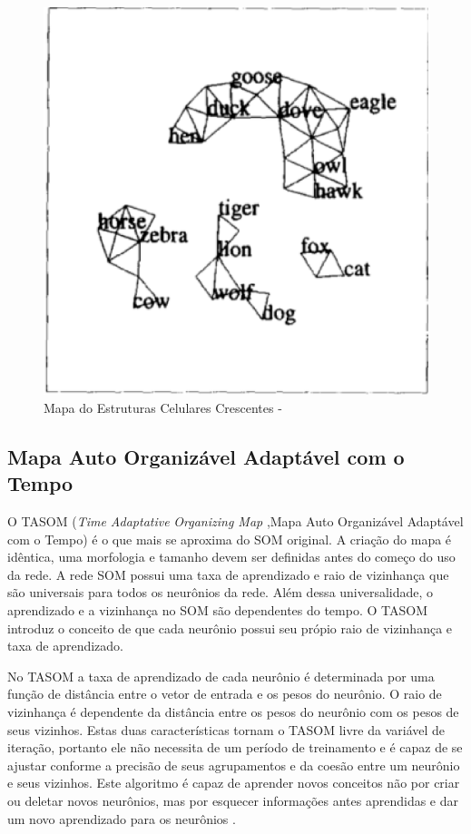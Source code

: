 \begin{figure}[!h]
\centering
\includegraphics[keepaspectratio=true,scale=0.50]
{figuras/cellsom.eps}
\caption{Mapa do Estruturas Celulares Crescentes - }
\label{data_titatic}
\end{figure}

\subsection{Mapa Auto Organizável Adaptável com o Tempo}
O TASOM (\textit{Time Adaptative} \textit{Organizing Map} ,Mapa Auto Organizável Adaptável com o Tempo) é o que mais se aproxima do SOM original. A criação do mapa é idêntica, uma morfologia e tamanho devem ser definidas antes do começo do uso da rede. A rede SOM possui uma taxa de aprendizado e raio de vizinhança que são universais para todos os neurônios da rede. Além dessa universalidade, o aprendizado e a vizinhança no SOM são dependentes do tempo. O TASOM introduz o conceito de que cada neurônio possui seu própio raio de vizinhança e taxa de aprendizado. 

No TASOM a taxa de aprendizado de cada neurônio é determinada por uma função de distância entre o vetor de entrada e os pesos do neurônio. O raio de vizinhança é dependente da distância entre os pesos do neurônio com os pesos de seus vizinhos. Estas duas características tornam o TASOM livre da variável de iteração, portanto ele não necessita de um período de treinamento e é capaz de se ajustar conforme a precisão de seus agrupamentos e da coesão entre um neurônio e seus vizinhos. Este algoritmo é capaz de aprender novos conceitos não por criar ou deletar novos neurônios, mas por esquecer informações antes aprendidas e dar um novo aprendizado para os neurônios \cite{tasom2001}.


